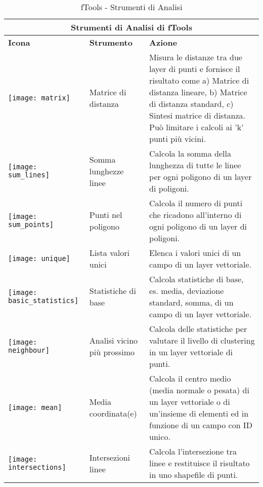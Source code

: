 \begin{table}[ht]
\centering
 \begin{tabular}{|m{1cm}|m{3cm}|m{12cm}|}
\hline \multicolumn{3}{|c|}{\textbf{Strumenti di Analisi di fTools}} \\
 \hline \textbf{Icona} & \textbf{Strumento} & \textbf{Azione} \\
 \hline \texttt{[image: matrix]} & Matrice di distanza &
Misura le distanze tra due layer di punti e fornisce il risultato come a) Matrice 
di distanza lineare, b) Matrice di distanza standard, c) Sintesi matrice di distanza.
Può limitare i calcoli ai 'k' punti più vicini. \\ 
 \hline \texttt{[image: sum\_lines]} & Somma lunghezze linee & Calcola
la somma della lunghezza di tutte le linee per ogni poligono di un layer di poligoni. \\
 \hline \texttt{[image: sum\_points]} & Punti nel poligono & Calcola il 
numero di punti che ricadono all'interno di ogni poligono di un layer di poligoni. \\
 \hline \texttt{[image: unique]} & Lista valori unici & Elenca i valori 
unici di un campo di un layer vettoriale. \\
 \hline \texttt{[image: basic\_statistics]} & Statistiche di base & Calcola 
statistiche di base, es. media, deviazione standard, somma, di un campo di un 
layer vettoriale. \\ 
 \hline \texttt{[image: neighbour]} & Analisi vicino più prossimo & 
Calcola delle statistiche per valutare il livello di clustering in un layer vettoriale 
di punti. \\
 \hline \texttt{[image: mean]} & Media coordinata(e) &
Calcola il centro medio (media normale o pesata) di un layer vettoriale o di 
un'insieme di elementi ed in funzione di un campo con ID unico. \\ 
 \hline \texttt{[image: intersections]} & Intersezioni linee &
Calcola l'intersezione tra linee e restituisce il risultato in uno shapefile di punti. \\
 \hline
\end{tabular}
\caption{fTools - Strumenti di Analisi}\label{tab:ftool_analysis}
\end{table}

